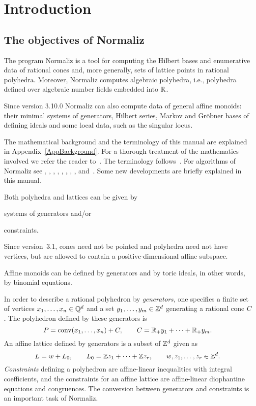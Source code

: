 \section{Introduction}\label{facil}

\subsection{The objectives of Normaliz}

The program Normaliz is a tool for computing
the Hilbert bases and enumerative data of rational cones and, more generally, sets of lattice points in rational polyhedra. Moreover, Normaliz computes algebraic polyhedra, i.e., polyhedra defined over algebraic number fields embedded into ${\mathbb R}$.

Since version 3.10.0 Normaliz can also compute data of general affine monoids: their minimal systems of generators, Hilbert series, Markov and Gröbner bases of defining ideals and some local data, such as the singular locus.

The mathematical background and the terminology of this manual are explained in Appendix~\ref{AppBackground}. For a thorough treatment of the mathematics involved we refer the reader to~\cite{BG}.
The terminology follows~\cite{BG}. For
algorithms of Normaliz see \cite{BruAuto}, \cite{BruVol}, \cite{BHIKS}, \cite{BI}, \cite{BI2},
\cite{BIS}, \cite{BK02}, \cite{BSS}, and~\cite{BS}. Some new developments are briefly explained in this manual.

Both polyhedra and lattices can be given by
\begin{arab}
	\item systems of generators and/or
	\item constraints.
\end{arab}
Since version~3.1, cones need not be pointed and polyhedra need not have vertices, but are allowed to contain a positive-dimensional affine subspace.

Affine monoids can be defined by generators and by toric ideals, in other words, by binomial equations.

In order to describe a rational polyhedron by \emph{generators}, one specifies a finite set of vertices $x_1,\dots,x_n\in{\mathbb Q}^d$ and a set $y_1,\dots,y_m\in{\mathbb Z}^d$ generating a rational cone $C$. The polyhedron defined by these generators is
$$
P=\operatorname{conv}(x_1,\dots,x_n)+C,\qquad C={\mathbb R}_+y_1+\dots+{\mathbb R}_+y_m.
$$
An affine lattice defined by generators is a subset of ${\mathbb Z}^d$ given as
$$
L=w+L_0,\qquad L_0={\mathbb Z} z_1+\dots+{\mathbb Z} z_r, \qquad w,z_1,\dots,z_r\in {\mathbb Z}^d.
$$
\emph{Constraints} defining a polyhedron are affine-linear inequalities with integral coefficients, and the constraints for an affine lattice are affine-linear diophantine equations and congruences. The conversion between generators and constraints is an important task of Normaliz.


